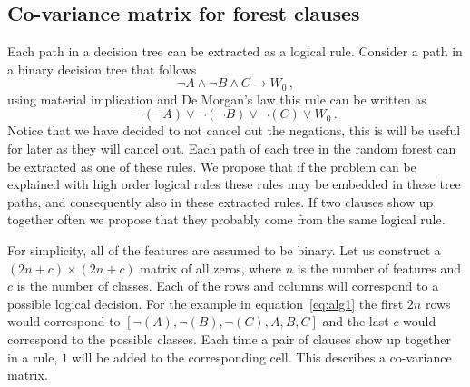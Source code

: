 \documentclass[10pt]{article}
\begin{document}
\subsection{Co-variance matrix for forest clauses}
Each path in a decision tree can be extracted as a logical rule. Consider a path in a binary decision tree that follows 
\[\neg A \land \neg B \land C \rightarrow W_0 \,,\]
using material implication and De Morgan's law this rule can be written as 
\begin{equation}
\neg(\neg A) \lor \neg (\neg B) \lor \neg(C) \lor W_0 \, .
\label{eq:alg1}
\end{equation}
Notice that we have decided to not cancel out the negations, this is will be useful for later as they will cancel out. Each path of each tree in the random forest can be extracted as one of these rules. We propose that if the problem can be explained with high order logical rules these rules may be embedded in these tree paths, and consequently also in these extracted rules. If two clauses show up together often we propose that they probably come from the same logical rule.  

For simplicity, all of the features are assumed to be binary. Let us construct a $(2n +c) \times (2n+c)$ matrix of all zeros, where $n$ is the number of features and $c$ is the number of classes. Each of the rows and columns will correspond to a possible logical decision. For the example in equation~\ref{eq:alg1} the first $2n$ rows would correspond to $[\neg(A), \neg(B), \neg(C), A, B, C]$ and the last $c$ would correspond to the possible classes. Each time a pair of clauses show up together in a rule, $1$ will be added to the corresponding cell. This describes a co-variance matrix.
\end{document}
